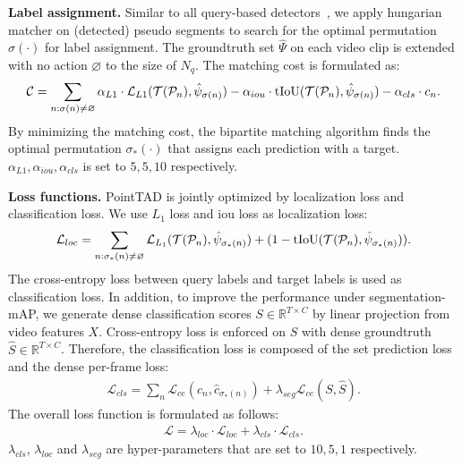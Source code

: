 \documentclass{article}
\renewcommand{\paragraph}[1]{\vspace{1.25mm}\noindent\textbf{#1}}
\begin{document}
\paragraph{Label assignment.} Similar to all query-based detectors~\cite{DBLP:conf/eccv/CarionMSUKZ20,DBLP:conf/iclr/ZhuSLLWD21,DBLP:journals/corr/abs-2203-16507,DBLP:conf/iccv/TanT0W21}, we apply hungarian matcher on (detected) pseudo segments to search for the optimal permutation $\sigma(\cdot)$ for label assignment. The groundtruth set $\hat{\Psi}$ on each video clip is extended with no action $\varnothing$ to the size of $N_q$. The matching cost is formulated as:
\begin{align}
    \mathcal{C} = \sum_{n:\sigma(n) \neq \varnothing} \alpha_{L1} \cdot \mathcal{L}_{L1}(\mathcal{T}(\mathcal{P}_n), \hat{\psi}_{\sigma(n)}) - \alpha_{iou} \cdot {\rm tIoU}(\mathcal{T}(\mathcal{P}_n), \hat{\psi}_{\sigma(n)}) - \alpha_{cls} \cdot c_n.
\end{align}
By minimizing the matching cost, the bipartite matching algorithm finds the optimal permutation $\sigma_*(\cdot)$ that assigns each prediction with a target. $\alpha_{L1}, \alpha_{iou}, \alpha_{cls}$ is set to $5,5,10$ respectively.

\paragraph{Loss functions.} PointTAD is jointly optimized by localization loss and classification loss. We use $L_1$ loss and iou loss as localization loss:
\begin{align}
    \mathcal{L}_{loc} = \sum_{n:\sigma_*(n) \neq \varnothing}  \mathcal{L}_{L_1}(\mathcal{T}(\mathcal{P}_n), \hat{\psi}_{\sigma_*(n)}) + (1 - {\rm tIoU}(\mathcal{T}(\mathcal{P}_n), \hat{\psi}_{\sigma_*(n)})).
\end{align}
The cross-entropy loss between query labels and target labels is used as classification loss. In addition, to improve the performance under segmentation-mAP, we generate dense classification scores $S \in \mathbb{R}^{T\times C}$ by linear projection from video features $X$. Cross-entropy loss is enforced on $S$ with dense groundtruth $\hat{S} \in \mathbb{R}^{T \times C}$. Therefore, the classification loss is composed of the set prediction loss and the dense per-frame loss:
\begin{align}
     \mathcal{L}_{cls} =  \sum_n \mathcal{L}_{ce}(c_n, \hat{c}_{\sigma_*(n)}) + \lambda_{seg} \mathcal{L}_{ce}(S, \hat{S}).
\end{align}
The overall loss function is formulated as follows:
\begin{align}
    \mathcal{L} = \lambda_{loc} \cdot \mathcal{L}_{loc} + \lambda_{cls} \cdot \mathcal{L}_{cls}.
\end{align}
$\lambda_{cls}$, $\lambda_{loc}$ and $\lambda_{seg}$ are hyper-parameters that are set to $10, 5, 1$ respectively.
\end{document}
